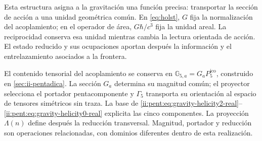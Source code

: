 Esta estructura asigna a la gravitación una función precisa:
transportar la sección de acción a una unidad geométrica común.
En \eqref{eq:holst}, \(G\) fija la normalización del acoplamiento;
en el operador de área, \(G\hbar/c^3\) fija la unidad areal.
La reciprocidad conserva esa unidad mientras cambia la lectura
orientada de acción. El estado reducido y sus ocupaciones aportan
después la información y el entrelazamiento asociados a la frontera.

El contenido tensorial del acoplamiento se conserva en
\(\mathbb G_{5,a}=G_aP^{\mathrm{ico}}_5\), construido en
\ref{sec:ii-pentadica}. La sección \(G_a\) determina su magnitud común;
el proyector selecciona el portador pentacomponente y \(\Gamma_5\)
transporta su orientación al espacio de tensores simétricos sin traza.
La base de \eqref{ii:pent:eq:gravity-helicity2-real}--\eqref{ii:pent:eq:gravity-helicity0-real}
explicita las cinco componentes. La proyección \(\Lambda(n)\) define
después la reducción transversal. Magnitud, portador y reducción son
operaciones relacionadas, con dominios diferentes dentro de esta realización.
